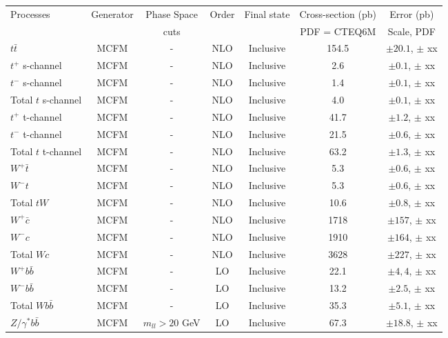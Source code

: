 \vspace{3mm}
\begin{table}[hbt]
\begin{center}
\renewcommand{\arraystretch}{1.2}
\begin{tabular}{|l|c|c|c|c|c|c|}\hline
Processes & Generator & Phase Space& Order & Final state & Cross-section (pb)& Error (pb) \\ 
 &  &  cuts & & & PDF = CTEQ6M & Scale, PDF \\ \hline
$t\bar{t}$ & MCFM & - & NLO & Inclusive & 154.5 & $\pm 20.1$, $\pm$ xx \\ \hline
$t^+$ s-channel & MCFM & - & NLO & Inclusive & 2.6 & $\pm 0.1$, $\pm$ xx \\ \hline
$t^-$ s-channel & MCFM & - & NLO & Inclusive & 1.4 & $\pm 0.1$, $\pm$ xx \\ \hline
Total $t$ s-channel & MCFM & - & NLO & Inclusive & 4.0 & $\pm 0.1$, $\pm$ xx \\ \hline
$t^+$ t-channel & MCFM & - & NLO & Inclusive & 41.7 & $\pm 1.2$, $\pm$ xx \\ \hline
$t^-$ t-channel & MCFM & - & NLO & Inclusive & 21.5 & $\pm 0.6$, $\pm$ xx \\ \hline
Total $t$ t-channel & MCFM & - & NLO & Inclusive & 63.2 & $\pm 1.3$, $\pm$ xx \\ \hline
$W^+ \bar{t}$ & MCFM & - & NLO & Inclusive & 5.3 & $\pm 0.6$, $\pm$ xx \\ \hline
$W^- t$ & MCFM & - & NLO & Inclusive & 5.3 & $\pm 0.6$, $\pm$ xx \\ \hline
Total $tW$ & MCFM & - & NLO & Inclusive & 10.6 & $\pm 0.8$, $\pm$ xx \\ \hline
$W^+ \bar{c}$ & MCFM & - & NLO & Inclusive & 1718 & $\pm 157$, $\pm$ xx \\ \hline
$W^- c$ & MCFM & - & NLO & Inclusive & 1910 & $\pm 164$, $\pm$ xx \\ \hline
Total $Wc$ & MCFM & - & NLO & Inclusive & 3628 & $\pm 227$, $\pm$ xx \\ \hline
$W^+ b\bar{b}$ & MCFM & - & LO & Inclusive & 22.1 & $\pm 4,4$, $\pm$ xx \\ \hline
$W^- b\bar{b}$ & MCFM & - & LO & Inclusive & 13.2 & $\pm 2.5$, $\pm$ xx \\ \hline
Total $Wb\bar{b}$ & MCFM & - & LO & Inclusive & 35.3 & $\pm 5.1$, $\pm$ xx \\ \hline
$Z/\gamma^* b\bar{b}$ & MCFM & $m_{ll} > 20$ GeV & LO & Inclusive & 67.3 & $\pm 18.8$, $\pm$ xx \\ \hline

\end{tabular}
\end{center}
\end{table}
